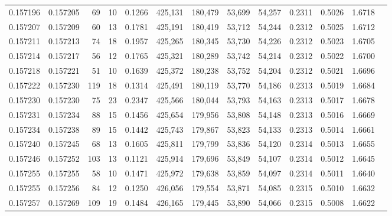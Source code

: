 \begin{tabular}{rrrrrrrrrrrrr}
0.157196 & 0.157205 &    69 &  10 &                                     0.1266 & 425,131 & 180,479 &  53,699 &  54,257 & 0.2311 & 0.5026 & 1.6718 \\
0.157207 & 0.157209 &    60 &  13 &                                     0.1781 & 425,191 & 180,419 &  53,712 &  54,244 & 0.2312 & 0.5025 & 1.6712 \\
0.157211 & 0.157213 &    74 &  18 &                                     0.1957 & 425,265 & 180,345 &  53,730 &  54,226 & 0.2312 & 0.5023 & 1.6705 \\
0.157214 & 0.157217 &    56 &  12 &                                     0.1765 & 425,321 & 180,289 &  53,742 &  54,214 & 0.2312 & 0.5022 & 1.6700 \\
0.157218 & 0.157221 &    51 &  10 &                                     0.1639 & 425,372 & 180,238 &  53,752 &  54,204 & 0.2312 & 0.5021 & 1.6696 \\
0.157222 & 0.157230 &   119 &  18 &                                     0.1314 & 425,491 & 180,119 &  53,770 &  54,186 & 0.2313 & 0.5019 & 1.6684 \\
0.157230 & 0.157230 &    75 &  23 &                                     0.2347 & 425,566 & 180,044 &  53,793 &  54,163 & 0.2313 & 0.5017 & 1.6678 \\
0.157231 & 0.157234 &    88 &  15 &                                     0.1456 & 425,654 & 179,956 &  53,808 &  54,148 & 0.2313 & 0.5016 & 1.6669 \\
0.157234 & 0.157238 &    89 &  15 &                                     0.1442 & 425,743 & 179,867 &  53,823 &  54,133 & 0.2313 & 0.5014 & 1.6661 \\
0.157240 & 0.157245 &    68 &  13 &                                     0.1605 & 425,811 & 179,799 &  53,836 &  54,120 & 0.2314 & 0.5013 & 1.6655 \\
0.157246 & 0.157252 &   103 &  13 &                                     0.1121 & 425,914 & 179,696 &  53,849 &  54,107 & 0.2314 & 0.5012 & 1.6645 \\
0.157255 & 0.157255 &    58 &  10 &                                     0.1471 & 425,972 & 179,638 &  53,859 &  54,097 & 0.2314 & 0.5011 & 1.6640 \\
0.157255 & 0.157256 &    84 &  12 &                                     0.1250 & 426,056 & 179,554 &  53,871 &  54,085 & 0.2315 & 0.5010 & 1.6632 \\
0.157257 & 0.157269 &   109 &  19 &                                     0.1484 & 426,165 & 179,445 &  53,890 &  54,066 & 0.2315 & 0.5008 & 1.6622 \\

\end{tabular}
